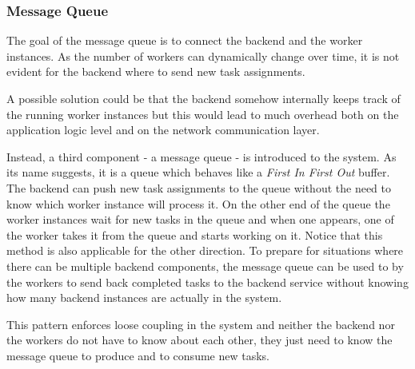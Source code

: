\subsubsection{Message Queue} \label{design-message-queue}


The goal of the message queue is to connect the backend and the worker instances. As the number of workers can dynamically change over time, it is not evident for the backend where to send new task assignments.

A possible solution could be that the backend somehow internally keeps track of the running worker instances but this would lead to much overhead both on the application logic level and on the network communication layer.

Instead, a third component - a message queue - is introduced to the system. As its name suggests, it is a queue which behaves like a \emph{First In First Out} buffer. The backend can push new task assignments to the queue without the need to know which worker instance will process it. On the other end of the queue the worker instances wait for new tasks in the queue and when one appears, one of the worker takes it from the queue and starts working on it. Notice that this method is also applicable for the other direction. To prepare for situations where there can be multiple backend components, the message queue can be used to by the workers to send back completed tasks to the backend service without knowing how many backend instances are actually in the system.

This pattern enforces loose coupling in the system and neither the backend nor the workers do not have to know about each other, they just need to know the message queue to produce and to consume new tasks. 

